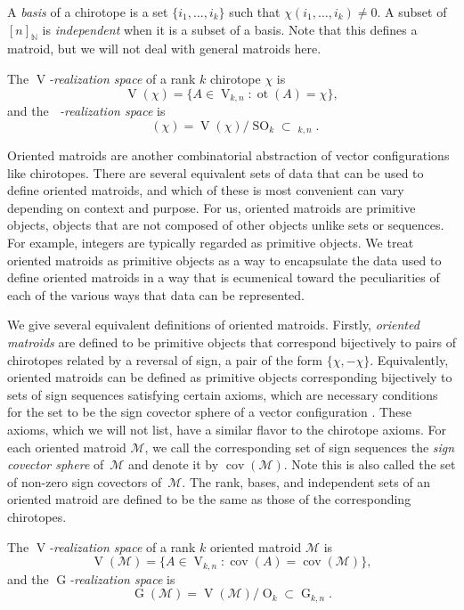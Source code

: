 \documentclass[JEP,XML,SOM,Unicode,NoFloatCountersInSection,published]{cedram}
\theoremstyle{remark}
\let\mc\mathcal
\let\mb\mathbb
\let\df\emph
\DeclareMathOperator{\g}{G}
\DeclareMathOperator{\oG}{\widetilde G}
\DeclareMathOperator{\orth}{O}
\DeclareMathOperator{\sorth}{SO}
\DeclareMathOperator{\stief}{V}
\DeclareMathOperator{\cov}{cov}
\DeclareMathOperator{\ot}{ot}
\begin{document}
A \df{basis} of a chirotope is a set $\{i_1,\dots,i_k\}$ such that $\chi(i_1,\dots,i_k) \neq 0$.
A subset of~$[n]_\mb{N}$ is \df{independent} when it is a subset of a basis.
Note that this defines a matroid, but we will not deal with general matroids here.

The \df{\hbox{$\stief$-realization} space} of a rank $k$ chirotope $\chi$ is
\[ \stief(\chi) =
\{ A \in \stief_{k,n}:\ot (A) = \chi\},
\]
and the \df{$\oG$-realization space} is
\[ \oG(\chi) = \stief(\chi)/\sorth_k \subset \oG_{k,n}. \]

Oriented matroids are another combinatorial abstraction of vector configurations like chirotopes.
There are several equivalent sets of data that can be used to define oriented matroids, and which of these is most convenient can vary depending on context and purpose.
For us, oriented matroids are primitive objects, \ie objects that are not composed of other objects unlike sets or sequences. For example, integers are typically regarded as primitive objects.
We treat oriented matroids as primitive objects as a way to encapsulate the data used to define oriented matroids in a way that is ecumenical toward the peculiarities of each of the various ways that data can be represented.

We give several equivalent definitions of oriented matroids.
Firstly, \df{oriented matroids} are defined to be primitive objects that correspond bijectively to pairs of chirotopes related by a reversal of sign, \ie a pair of the form $\{\chi,-\chi\}$.
Equivalently, oriented matroids can be defined as primitive objects corresponding bijectively to sets of sign sequences satisfying certain axioms, which are necessary conditions for the set to be the sign covector sphere of a vector configuration \cite[\S 3.7]{bjorner1999oriented}.
These axioms, which we will not list, have a similar flavor to the chirotope axioms.
For each oriented matroid $\mc{M}$, we call the corresponding set of sign sequences the \df{sign covector sphere} of~$\mc{M}$ and denote it by $\cov(\mc{M})$.
Note this is also called the set of non-zero sign covectors of~$\mc{M}$.
The rank, bases, and independent sets of an oriented matroid are defined to be the same as those of the corresponding chirotopes.

The \df{\hbox{$\stief$-realization} space} of a rank $k$ oriented matroid $\mc{M}$ is
\[ \stief(\mc{M}) =
\{ A \in \stief_{k,n}:\cov (A) = \cov(\mc{M})\},
\]
and the \df{$\g$-realization space} is
\[ \g(\mc{M}) = \stief(\mc{M})/\orth_k \subset \g_{k,n}. \]
\end{document}
